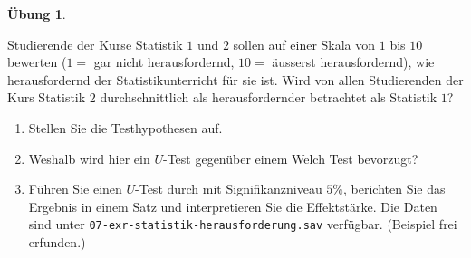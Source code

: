 \documentclass[
]{book}
\providecommand{\tightlist}{%
  \setlength{\itemsep}{0pt}\setlength{\parskip}{0pt}}
\theoremstyle{definition}
\theoremstyle{definition}
\theoremstyle{definition}
\newtheorem{exercise}{Übung}[chapter]
\theoremstyle{definition}
\theoremstyle{remark}
\begin{document}
\begin{exercise}
\protect\hypertarget{exr:statistik-herausforderung}{}\label{exr:statistik-herausforderung}\leavevmode

Studierende der Kurse Statistik \(1\) und \(2\) sollen auf einer Skala von \(1\) bis \(10\) bewerten (\(1=\) gar nicht herausfordernd, \(10 =\) äusserst herausfordernd), wie herausfordernd der Statistikunterricht für sie ist. Wird von allen Studierenden der Kurs Statistik \(2\) durchschnittlich als herausfordernder betrachtet als Statistik \(1\)?

\begin{enumerate}
\def\labelenumi{\alph{enumi})}
\tightlist
\item
  Stellen Sie die Testhypothesen auf.
\item
  Weshalb wird hier ein \(U\)-Test gegenüber einem Welch Test bevorzugt?
\item
  Führen Sie einen \(U\)-Test durch mit Signifikanzniveau \(5\%\), berichten Sie das Ergebnis in einem Satz und interpretieren Sie die Effektstärke. Die Daten sind unter \texttt{07-exr-statistik-herausforderung.sav} verfügbar. (Beispiel frei erfunden.)
\end{enumerate}

\end{exercise}
\end{document}
